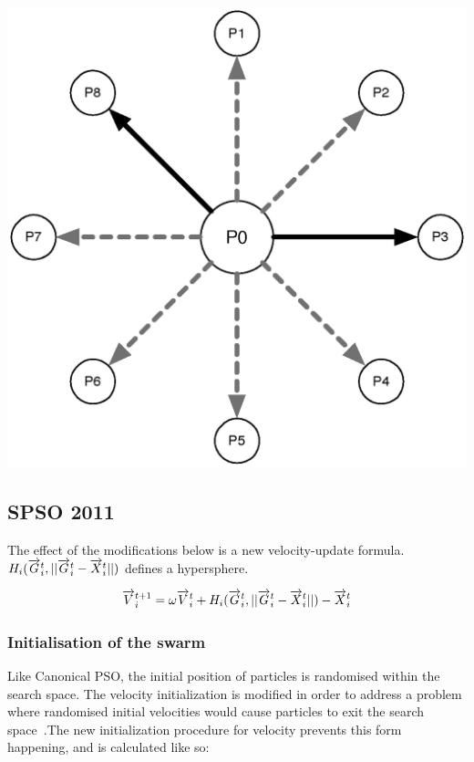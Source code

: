\documentclass{csfourzero}
\newcommand{\rarrow}[1]{\overrightarrow{#1\vphantom{b}}}
\newenvironment{Figure}
  {\par\medskip\noindent\minipage{\linewidth}}
  {\endminipage\par\medskip}
\begin{document}
\begin{multicols}{3}
  \begin{Figure}
    \centering
    \includegraphics[width=\linewidth]{star_topology.eps}\label{fig:adaptive_random_topology}
  \end{Figure}
\end{multicols}

\subsection{SPSO 2011}

The effect of the modifications below is a new velocity-update formula.
$H_i(\rarrow{G}_i^t,||\rarrow{G}_i^t - \rarrow{X}_i^t||)$ defines a
hypersphere.

\begin{equation}
  \rarrow{V}_i^{t+1} = \omega \rarrow{V}_i^t + H_i(\rarrow{G}_i^t,||\rarrow{G}_i^t - \rarrow{X}_i^t||) - \rarrow{X}_i^t
\end{equation}

\subsubsection{Initialisation of the swarm}

Like Canonical PSO, the initial position of particles is randomised within the
search space. The velocity initialization is modified in order to address a
problem where randomised initial velocities would cause particles to exit the
search space~\cite{Helwig:2008bl}.The new initialization procedure for velocity
prevents this form happening, and is calculated like so:
\end{document}
